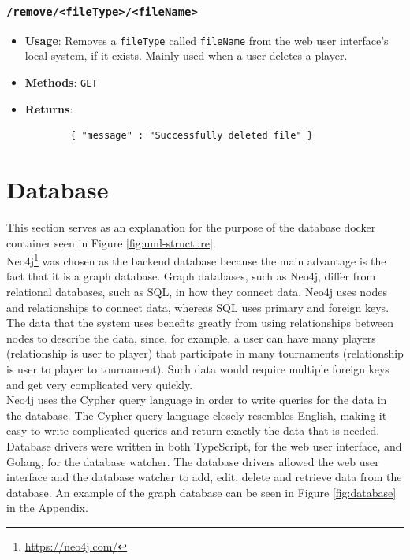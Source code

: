 \documentclass[a4paper, 12pt]{report}
\begin{document}
\subsubsection*{\texttt{/remove/<fileType>/<fileName>}}
\begin{itemize}
	\item \textbf{Usage}: Removes a \texttt{fileType} called \texttt{fileName}
	from the web user interface's local system, if it exists. Mainly used when
	a user deletes a player.
	\item \textbf{Methods}: \texttt{GET}
	\item \textbf{Returns}:
	\begin{verbatim}
		{ "message" : "Successfully deleted file" }
	\end{verbatim}
\end{itemize}

\section{Database}

This section serves as an explanation for the purpose of the database docker
container seen in Figure \ref{fig:uml-structure}. \\

Neo4j\footnote{\url{https://neo4j.com/}} was chosen as the backend database
because the main advantage is the fact that it is a graph database. Graph databases,
such as Neo4j, differ from relational databases, such as SQL, in how they connect
data. Neo4j uses nodes and relationships to connect data, whereas SQL uses
primary and foreign keys. The data that the system uses benefits greatly from
using relationships between nodes to describe the data, since, for example, a user
can have many players (relationship is user to player) that participate in many
tournaments (relationship is user to player to tournament). Such data would require
multiple foreign keys and get very complicated very quickly. \\

Neo4j uses the Cypher query language in order to write queries for the data in
the database. The Cypher query language closely resembles English, making it easy
to write complicated queries and return exactly the data that is needed. Database
drivers were written in both TypeScript, for the web user interface, and Golang,
for the database watcher. The database drivers allowed the web user interface
and the database watcher to add, edit, delete and retrieve data from the
database. An example of the graph database can be seen in Figure \ref{fig:database}
in the Appendix.
\end{document}
